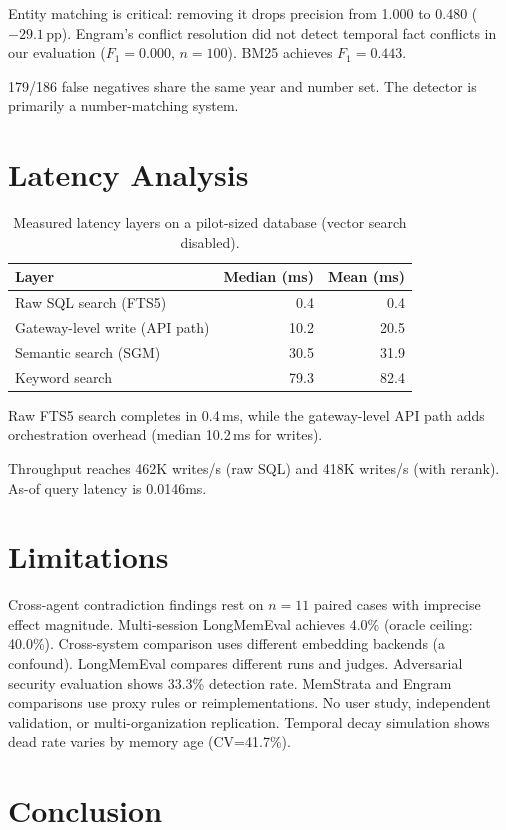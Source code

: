 \documentclass{llncs}
\begin{document}
Entity matching is critical: removing it drops precision from 1.000 to 0.480 ($-29.1$\,pp). Engram's conflict resolution did not detect temporal fact conflicts in our evaluation ($F_1{=}0.000$, $n{=}100$). BM25 achieves $F_1{=}0.443$.

179/186 false negatives share the same year and number set. The detector is primarily a number-matching system.

\section{Latency Analysis}


\begin{table}[h]
\centering
\caption{Measured latency layers on a pilot-sized database (vector search disabled).}
\begin{tabular}{lrr}
\toprule
Layer & Median (ms) & Mean (ms) \\
\midrule
Raw SQL search (FTS5) & 0.4 & 0.4 \\
Gateway-level write (API path) & 10.2 & 20.5 \\
Semantic search (SGM) & 30.5 & 31.9 \\
Keyword search & 79.3 & 82.4 \\
\bottomrule
\end{tabular}
\end{table}

Raw FTS5 search completes in 0.4\,ms, while the gateway-level API path adds orchestration overhead (median 10.2\,ms for writes).

Throughput reaches 462K writes/s (raw SQL) and 418K writes/s (with rerank). As-of query latency is 0.0146ms.

\section{Limitations}

Cross-agent contradiction findings rest on $n{=}11$ paired cases with imprecise effect magnitude. Multi-session LongMemEval achieves 4.0\% (oracle ceiling: 40.0\%). Cross-system comparison uses different embedding backends (a confound). LongMemEval compares different runs and judges. Adversarial security evaluation shows 33.3\% detection rate. MemStrata and Engram comparisons use proxy rules or reimplementations. No user study, independent validation, or multi-organization replication. Temporal decay simulation shows dead rate varies by memory age (CV=41.7\%).
\section{Conclusion}
\end{document}
